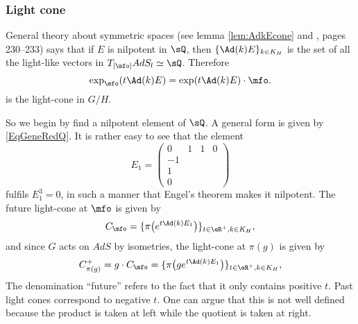 \subsubsection{Light cone}

General theory about symmetric spaces (see lemma \ref{lem:AdkEcone} and \cite{kobayashi2}, pages 230--233) says that if $E$ is nilpotent in $\sQ$, then $\{\Ad(k)E\}_{k\in K_H}$ is the set of all the light-like vectors in $T_{[\mfo]}AdS_l\simeq\sQ$. Therefore
\begin{equation}
  \exp_{\mfo}( t\Ad(k)E )=\exp(t\Ad(k)E)\cdot\mfo.
\end{equation}
is the light-cone in $G/H$.  


So we begin by find a nilpotent element of $\sQ$. A general form is given by \eqref{EqGeneRedQ}. It is rather easy to see that the element
\begin{equation}
E_1=
\begin{pmatrix}
0&1&1&0\\
-1\\
1\\
0
\end{pmatrix}
\end{equation}
 fulfils $E_1^3=0$, in such a manner that Engel's theorem 
 makes it nilpotent. The future light-cone at $\mfo$ is given by
\begin{equation}  \label{eq:exprcone}
C_{\mfo}=\{  \pi\big(  e^{t\Ad(k)E_1}  \big)  \}_{t\in\eR^+,k\in K_H},
\end{equation}
and since $G$ acts on $AdS$ by isometries, the light-cone at $\pi(g)$ is given by
\begin{equation} \label{eq_defcone}
  C^+_{\pi(g)}=g\cdot C_{\mfo}=\{  \pi\big( g e^{t\Ad(k)E_1}  \big)  \}_{t\in\eR^+,k\in K_H},
\end{equation}
The denomination ``future'' refers to the fact that it only contains positive $t$. Past light cones correspond to negative $t$.
One can argue that this is not well defined because the product is taken at left while the quotient is taken at right. 


